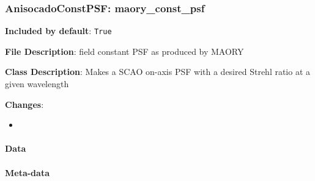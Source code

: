 \subsubsection{AnisocadoConstPSF: \textquotedbl{}maory\_const\_psf\textquotedbl{}%
  \label{anisocadoconstpsf-maory-const-psf}%
}

\textbf{Included by default}: \texttt{True}

\textbf{File Description}: field constant PSF as produced by MAORY

\textbf{Class Description}: Makes a SCAO on-axis PSF with a desired Strehl ratio at a given wavelength

\textbf{Changes}:

\begin{itemize}
\item \end{itemize}


\paragraph{Data%
  \label{id1}%
}

\begin{figure}[H]
\noindent{}\label{fig-maory-const-psf}
\end{figure}


\paragraph{Meta-data%
  \label{id2}%
}


